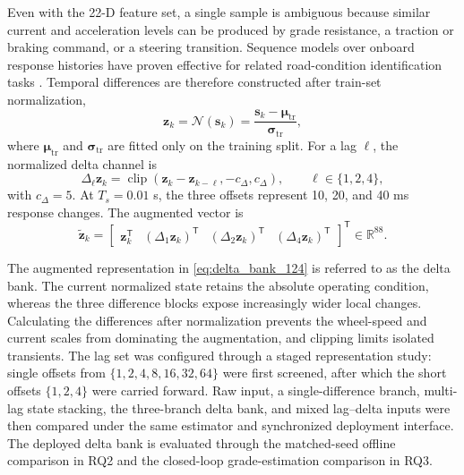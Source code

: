 \documentclass{ieeeaccess}
\newcommand{\citep}[1]{\cite{#1}}
\begin{document}
Even with the 22-D feature set, a single sample is ambiguous because similar current and acceleration levels can be produced by grade resistance, a traction or braking command, or a steering transition. Sequence models over onboard response histories have proven effective for related road-condition identification tasks \citep{Liang2022LSTMRoadID}. Temporal differences are therefore constructed after train-set normalization,
\begin{equation}
\mathbf z_k=\mathcal N(\mathbf s_k)
=\frac{\mathbf s_k-\boldsymbol\mu_{\mathrm{tr}}}
{\boldsymbol\sigma_{\mathrm{tr}}},
\label{eq:feature_train_normalization}
\end{equation}
where $\boldsymbol\mu_{\mathrm{tr}}$ and $\boldsymbol\sigma_{\mathrm{tr}}$ are fitted only on the training split. For a lag $\ell$, the normalized delta channel is
\begin{equation}
\Delta_{\ell}\mathbf z_k=
\operatorname{clip}\!\left(
\mathbf z_k-\mathbf z_{k-\ell},-c_{\Delta},c_{\Delta}
\right),\qquad \ell\in\{1,2,4\},
\label{eq:multiscale_delta_lag}
\end{equation}
with $c_{\Delta}=5$. At $T_s=0.01$ s, the three offsets represent 10, 20, and 40 ms response changes. The augmented vector is
\begin{equation}
\widetilde{\mathbf z}_k=
\begin{bmatrix}
\mathbf z_k^{\mathsf T}&
(\Delta_1\mathbf z_k)^{\mathsf T}&
(\Delta_2\mathbf z_k)^{\mathsf T}&
(\Delta_4\mathbf z_k)^{\mathsf T}
\end{bmatrix}^{\mathsf T}
\in\mathbb R^{88}.
\label{eq:delta_bank_124}
\end{equation}

The augmented representation in \eqref{eq:delta_bank_124} is referred to as the delta bank. The current normalized state retains the absolute operating condition, whereas the three difference blocks expose increasingly wider local changes. Calculating the differences after normalization prevents the wheel-speed and current scales from dominating the augmentation, and clipping limits isolated transients. The lag set was configured through a staged representation study: single offsets from $\{1,2,4,8,16,32,64\}$ were first screened, after which the short offsets $\{1,2,4\}$ were carried forward. Raw input, a single-difference branch, multi-lag state stacking, the three-branch delta bank, and mixed lag--delta inputs were then compared under the same estimator and synchronized deployment interface. The deployed delta bank is evaluated through the matched-seed offline comparison in RQ2 and the closed-loop grade-estimation comparison in RQ3.
\end{document}
